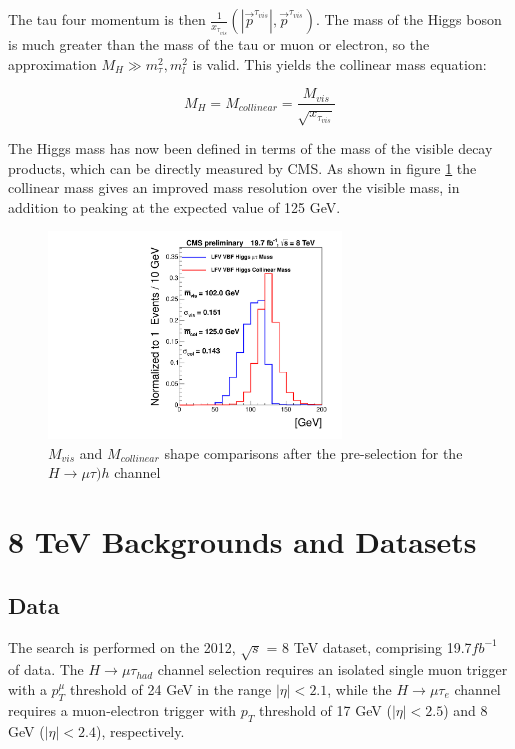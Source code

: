 \documentclass[oneside, letterpaper, oldfontcommands]{memoir}
\begin{document}
The tau four momentum is then $\frac{1}{x_{\tau_{vis}}}\left(|\vec{p}^{\tau_{vis}}|,\vec{p}^{\tau_{vis}}\right)$. The mass of the Higgs boson is much greater than the mass of the tau or muon or electron, so the approximation $M_{H} \gg m_{\tau}^2,m_{l}^2$ is valid. This yields the collinear mass equation:

\begin{equation} 
M_{H} = M_{collinear} = \frac{M_{vis}}{\sqrt{x_{\tau_{vis}}}}
\end{equation}

The Higgs mass has now been defined in terms of the mass of the visible decay products, which can be directly measured by CMS. As shown in figure \ref{fig:MvisMcol} the collinear mass gives an improved mass resolution over the visible mass, in addition to peaking at the expected value of 125 GeV. 

\begin{figure}[hbtp]\begin{center}
\includegraphics[height=5.5cm]{masses_muhad_VBF_After_Presel_signal.pdf}
 \caption{$M_{vis}$  and $M_{collinear}$  shape comparisons after the pre-selection for the $H \rightarrow \mu\tau){h}$ channel}
 \label{fig:MvisMcol}\end{center}\end{figure}

\section{8 TeV Backgrounds and Datasets}
\subsection{Data}
\qquad The search is performed on the 2012, $\sqrt{s}$ = 8 TeV dataset, comprising 19.7$fb^{-1}$ of data. The $H \rightarrow \mu\tau_{had}$ channel selection requires an isolated single muon trigger with a $p_{T}^{\mu}$ threshold of 24 GeV in the range $|\eta| < 2.1$, while the $H \rightarrow \mu\tau_{e}$ channel requires a muon-electron trigger with $p_{T}$ threshold of 17 GeV ($|\eta| < 2.5$) and 8 GeV ($|\eta| < 2.4$), respectively. 
\end{document}
